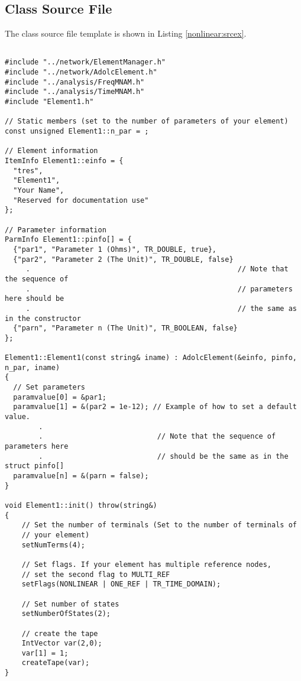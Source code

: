 \subsection{Class Source File}

The class source file template is shown in Listing
\ref{nonlinear:srcex}.

\begin{lstlisting}[firstnumber=1, label={nonlinear:srcex},
    caption={Element1.cc}]

#include "../network/ElementManager.h"
#include "../network/AdolcElement.h"
#include "../analysis/FreqMNAM.h"
#include "../analysis/TimeMNAM.h"
#include "Element1.h"

// Static members (set to the number of parameters of your element)
const unsigned Element1::n_par = ;

// Element information
ItemInfo Element1::einfo = {
  "tres",
  "Element1",
  "Your Name",
  "Reserved for documentation use"
};

// Parameter information
ParmInfo Element1::pinfo[] = {
  {"par1", "Parameter 1 (Ohms)", TR_DOUBLE, true},
  {"par2", "Parameter 2 (The Unit)", TR_DOUBLE, false}
     .                                                 // Note that the sequence of
     .                                                 // parameters here should be
     .                                                 // the same as in the constructor
  {"parn", "Parameter n (The Unit)", TR_BOOLEAN, false}
};

Element1::Element1(const string& iname) : AdolcElement(&einfo, pinfo, n_par, iname)
{
  // Set parameters
  paramvalue[0] = &par1;
  paramvalue[1] = &(par2 = 1e-12); // Example of how to set a default value.
        .
        .                           // Note that the sequence of parameters here
        .                           // should be the same as in the struct pinfo[]
  paramvalue[n] = &(parn = false);
}

void Element1::init() throw(string&)
{
    // Set the number of terminals (Set to the number of terminals of
    // your element)
    setNumTerms(4);

    // Set flags. If your element has multiple reference nodes,
    // set the second flag to MULTI_REF
    setFlags(NONLINEAR | ONE_REF | TR_TIME_DOMAIN);

    // Set number of states
    setNumberOfStates(2);

    // create the tape
    IntVector var(2,0);
    var[1] = 1;
    createTape(var);
}


\end{lstlisting}
